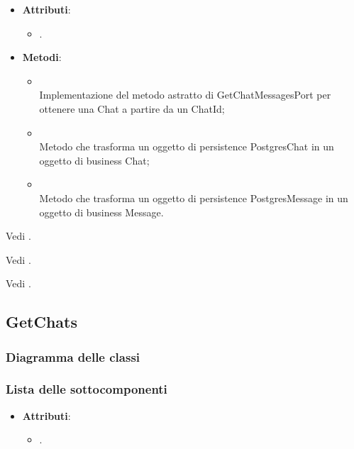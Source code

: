 \documentclass[10pt, a4paper]{article}
\begin{document}
\label{GetChatMessagesPostgresDettaglio}
\begin{itemize}
    \item \textbf{Attributi}:
    \begin{itemize}
        \item {}.
    \end{itemize}
    \item \textbf{Metodi}:
    \begin{itemize}
        \item {}\\
        Implementazione del metodo astratto di GetChatMessagesPort per ottenere una Chat a partire da un ChatId;
        \item {}\\
        Metodo che trasforma un oggetto di persistence PostgresChat in un oggetto di business Chat;
        \item {}\\
        Metodo che trasforma un oggetto di persistence PostgresMessage in un oggetto di business Message.
    \end{itemize}
\end{itemize}

Vedi .

Vedi .

Vedi .

\subsection{GetChats}
\subsubsection{Diagramma delle classi}
\subsubsection{Lista delle sottocomponenti}

\label{ChatFilterDettaglio}
\begin{itemize}
    \item \textbf{Attributi}:
    \begin{itemize}
        \item {}.
    \end{itemize}
\end{itemize}
\end{document}
